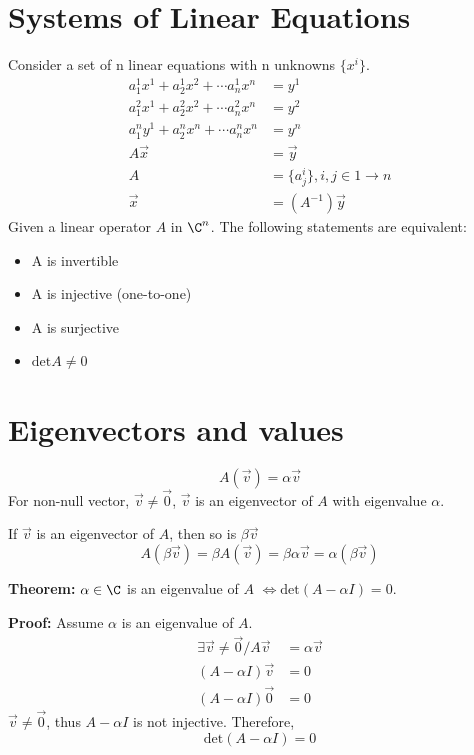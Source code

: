 \documentclass[cplx.tex]{subfiles}
\begin{document}
\section{Systems of Linear Equations}
Consider a set of n linear equations with n unknowns $\{x^i\}$.
\begin{align}
    a_1^1x^1 + a_2^1x^2 + \cdots a^1_nx^n &= y^1 \\
    a_1^2x^1 + a_2^2x^2 + \cdots a^2_nx^n &= y^2 \\
    a_1^ny^1 + a_2^nx^n + \cdots a^n_nx^n &= y^n \\
    A\vec{x} &= \vec{y} \\
    A &= \{a^i_j\}, i,j \in 1 \to n\\
    \vec{x} &= (A^{-1})\vec{y}
\end{align}
Given a linear operator $A$ in $\C^n$. The following statements are equivalent:
\begin{itemize}
    \item A is invertible
    \item A is injective (one-to-one)
    \item A is surjective 
    \item $\text{det}A \neq 0$
\end{itemize}

\section{Eigenvectors and values}
\begin{equation}
    A(\vec{v}) = \alpha\vec{v}
\end{equation}
For non-null vector, $\vec{v} \neq \vec{0}$, $\vec{v}$ is an eigenvector of $A$ with eigenvalue $\alpha$.

If $\vec{v}$ is an eigenvector of $A$, then so is $\beta\vec{v}$
\begin{equation}
    A(\beta\vec{v}) = \beta A(\vec{v}) = \beta\alpha\vec{v} = \alpha(\beta\vec{v})
\end{equation}

\textbf{Theorem: }$\alpha \in \C$ is an eigenvalue of $A$ $\iff \text{det}(A - \alpha I) = 0$.

\textbf{Proof: }Assume $\alpha$ is an eigenvalue of $A$.
\begin{align} 
    \exists \vec{v} \neq \vec{0} / A\vec{v} &= \alpha\vec{v} \\
    (A - \alpha I)\vec{v} &= 0 \\
    (A - \alpha I) \vec{0} &= 0 
\end{align}
$\vec{v} \neq \vec{0}$, thus $A - \alpha I$ is not injective. Therefore, 
\begin{equation}
    \text{det}(A - \alpha I) = 0
\end{equation}
\end{document}
